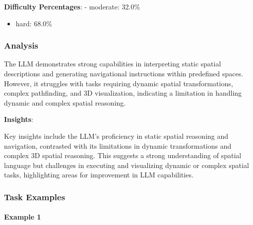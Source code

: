 \documentclass[fleqn,10pt]{wlscirep}
\providecommand{\tightlist}{%
  \setlength{\itemsep}{0pt}\setlength{\parskip}{0pt}}
\begin{document}
\textbf{Difficulty Percentages}: - moderate: 32.0\%

\begin{itemize}
\tightlist
\item
  hard: 68.0\%
\end{itemize}

\hypertarget{analysis-21}{%
\subsubsection{Analysis}\label{analysis-21}}

The LLM demonstrates strong capabilities in interpreting static spatial
descriptions and generating navigational instructions within predefined
spaces. However, it struggles with tasks requiring dynamic spatial
transformations, complex pathfinding, and 3D visualization, indicating a
limitation in handling dynamic and complex spatial reasoning.

\textbf{Insights}:

Key insights include the LLM's proficiency in static spatial reasoning
and navigation, contrasted with its limitations in dynamic
transformations and complex 3D spatial reasoning. This suggests a strong
understanding of spatial language but challenges in executing and
visualizing dynamic or complex spatial tasks, highlighting areas for
improvement in LLM capabilities.

\hypertarget{task-examples-22}{%
\subsubsection{Task Examples}\label{task-examples-22}}

\hypertarget{example-1-22}{%
\paragraph{Example 1}\label{example-1-22}}
\end{document}
